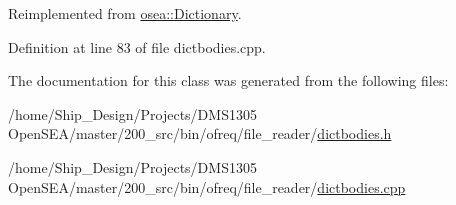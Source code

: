 Reimplemented from \hyperlink{classosea_1_1_dictionary_ae96470181c8b1762204493fa45e96d7c}{osea\-::\-Dictionary}.



Definition at line 83 of file dictbodies.\-cpp.



The documentation for this class was generated from the following files\-:\begin{DoxyCompactItemize}
\item 
/home/\-Ship\-\_\-\-Design/\-Projects/\-D\-M\-S1305 Open\-S\-E\-A/master/200\-\_\-src/bin/ofreq/file\-\_\-reader/\hyperlink{dictbodies_8h}{dictbodies.\-h}\item 
/home/\-Ship\-\_\-\-Design/\-Projects/\-D\-M\-S1305 Open\-S\-E\-A/master/200\-\_\-src/bin/ofreq/file\-\_\-reader/\hyperlink{dictbodies_8cpp}{dictbodies.\-cpp}\end{DoxyCompactItemize}
